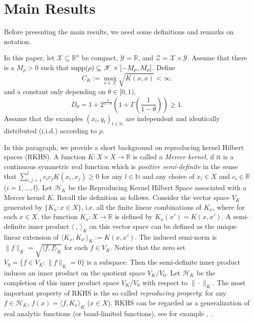 \documentclass[twoside,twocolumn,journal]{IEEEtran}
\def\N{{\mathbb N}}
\def\R{{\mathbb R}}        %
\def\<{{\langle}}
\def\>{{\rangle}}
\def\H{{\mathscr H}}
\def\X{{\mathscr X}}
\def\Y{{\mathscr Y}}
\def\ZZ{{\mathscr Z}}
\def\supp{{\rm supp}}
\begin{document}
\section{Main Results}

Before presenting the main results, we need some definitions and remarks on notation.

In this paper, let $\X\subseteq \R^n$ be compact, $\Y=\R$, and $\ZZ=\X\times \Y$. Assume that there is a $M_\rho>0$ such that
$\supp (\rho) \subseteq \X\times [-M_\rho,M_\rho]$.
Define
\begin{equation} \label{eq:ck}
C_K:=\max_{x\in\X} \sqrt{K(x,x)} < \infty.
\end{equation}
and a constant only depending on $\theta\in [0,1)$,
\begin{equation} \label{eq:D}
D_\theta= 1+ 2^{\frac{\theta}{1-\theta}} \left(1+\Gamma \left(\frac{1}{1-\theta} \right) \right) \geq 1.
\end{equation}
Assume that the examples $(x_t,y_t)_{t\in \N}$ are independent and identically distributed (i.i.d.) according to $\rho$.


In this paragraph, we provide a short background on reproducing kernel Hilbert spaces (RKHS).
A function $K:X\times X\to \R$ is called a \emph{Mercer kernel}, if it is a
continuous symmetric real function which is \emph{positive
semi-definite} in the sense that $\sum_{i,j=1}^l c_i c_j K(x_i,
x_j)\geq 0$ for any $l\in \N$ and any choice of $x_i\in X$ and
$c_i \in \R$ ($i=1,\ldots,l$). Let $\H_K$ be the Reproducing Kernel Hilbert Space
associated with a Mercer kernel $K$. Recall the definition as
follows. Consider the vector space $V_K$ generated by $\{K_x:x\in
X\}$, i.e. all the finite linear combinations of $K_x$, where for
each $x\in X$, the function $K_x:X\to \R$ is defined by
$K_x(x')=K(x,x')$. A semi-definite inner product $\<\ ,\ \>_K$ on
this vector space can be defined as the unique linear extension of
$\<K_x,K_{x'}\>_K:=K(x,x')$. The induced semi-norm is $\|f\|_K =
\sqrt{\<f,f\>_K}$ for each $f\in V_K$. Notice that the zero set
$V_0=\{f\in V_K: \|f\|_K=0\}$ is a subspace. Then the
semi-definite inner product induces an inner product on the
quotient space $V_K/V_0$. Let $\H_K$ be the completion of this
inner product space $V_K/V_0$ with respect to $\|\cdot\|_K$. The most important
property of RKHS is the so called \emph{reproducing property}: for any $f\in
\H_K$, $f(x)=\<f,K_x\>_K$ ($x\in X$). RKHS can be regarded as a generalization of
real analytic functions (or band-limited functions), see for example \cite{Daubechies92}, \cite{SmaZho-ShannonI}.
\end{document}
